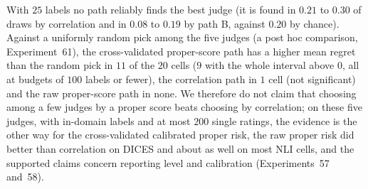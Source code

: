 With $25$ labels no path reliably finds the best judge (it is found in $0.21$ to $0.30$ of draws by correlation and in $0.08$ to $0.19$ by path B, against $0.20$ by chance).
Against a uniformly random pick among the five judges (a post hoc comparison, Experiment~61), the cross-validated proper-score path has a higher mean regret than the random pick in $11$ of the $20$ cells ($9$ with the whole interval above $0$, all at budgets of $100$ labels or fewer), the correlation path in $1$ cell (not significant) and the raw proper-score path in none.
We therefore do not claim that choosing among a few judges by a proper score beats choosing by correlation; on these five judges, with in-domain labels and at most $200$ single ratings, the evidence is the other way for the cross-validated calibrated proper risk, the raw proper risk did better than correlation on DICES and about as well on most NLI cells, and the supported claims concern reporting level and calibration (Experiments~57 and~58).

